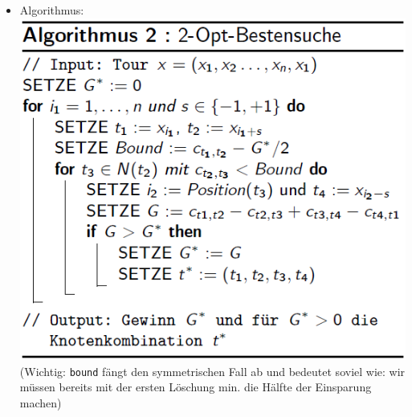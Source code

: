 \documentclass[12pt]{article}
\begin{document}
\begin{itemize}
\begin{itemize}
					\item Algorithmus:\\
						\includegraphics[scale=0.6]{SequentielleSucheAlgo}\\
						(Wichtig: \texttt{bound} fängt den symmetrischen Fall ab und bedeutet soviel wie: wir müssen bereits mit der ersten Löschung min. die Hälfte der Einsparung machen)
				\end{itemize}
		\end{itemize}
\end{document}
